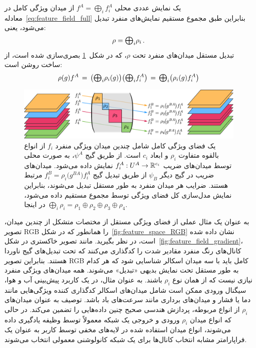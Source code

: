 				یک نمایش عددی محلی $f^A = \bigoplus_i f_i^A$ از میدان ویژگی کامل در معادله~\eqref{eq:feature_field_full} بنابراین طبق مجموع مستقیم نمایش‌های منفرد تبدیل می‌شود، یعنی:
				\begin{align}
					\rho = \scalebox{1.1}{$\bigoplus$}_i \rho_i \,.
				\end{align}
				تبدیل مستقل میدان‌های منفرد تحت $\rho$، که در شکل~\ref{fig:feature_spaces_oplus} بصری‌سازی شده است، از ساخت روشن است:
				\begin{align}
					\rho(g)f^A
					\,=\, \left(\scalebox{1.1}{$\bigoplus$}_i \rho_i(g)\right) \! \left(\scalebox{1.1}{$\bigoplus$}_i f_i^A\right)
					\,=\, \scalebox{1.1}{$\bigoplus$}_i \! \left(\rho_i(g) f_i^A\right)
				\end{align}
				
				\begin{figure}
					\centering
					\includegraphics[width=.94\textwidth]{figures/feature_field_repr_examples.pdf}
					\vspace*{0ex}
					\caption{\small
						یک فضای ویژگی کامل شامل چندین میدان ویژگی منفرد $f_i$ از انواع بالقوه متفاوت $\rho_i$ و ابعاد $c_i$ است.
						از طریق گیج $\psi^A$، به صورت محلی توسط میدان‌های ضریب $f_i^A: U^A \to \mathbb{R}^{c_i}$ نمایش داده می‌شود.
						میدان‌های ضریب در گیج دیگر $\psi_B$ از طریق تبدیل گیج $f_i^B = \rho_i\big(g^{BA}\big)f_i^A$ مرتبط هستند.
						ضرایب هر میدان منفرد به طور مستقل تبدیل می‌شوند، بنابراین نمایش مدل‌سازی کل فضای ویژگی توسط مجموع مستقیم داده می‌شود، در اینجا $\bigoplus_i \!\rho_i = \rho_1 \oplus \rho_2 \oplus \rho_3 \oplus \rho_4$.
					}
					\label{fig:feature_spaces_oplus}
					\end{figure}

						به عنوان یک مثال عملی از فضای ویژگی مستقل از مختصات متشکل از چندین میدان، تصویر RGB را همانطور که در شکل~\ref{fig:feature_space_RGB} نشان داده شده است، در نظر بگیرید.
						مانند تصویر خاکستری در شکل~\ref{fig:feature_field_gradient}، کانال‌های رنگ منفرد مقادیر شدت را کدگذاری می‌کنند که تحت تبدیل‌های گیج ناوردا هستند.
						بنابراین تصویر RGB کامل باید با سه میدان اسکالر شناسایی شود که هر کدام به طور مستقل تحت نمایش بدیهی «تبدیل» می‌شوند.
						همه میدان‌های ویژگی منفرد نیازی نیست که از همان نوع $\rho_i$ باشند.
						به عنوان مثال، در یک کاربرد پیش‌بینی آب و هوا، سیگنال ورودی ممکن است شامل میدان‌های اسکالر کدگذاری کننده ویژگی‌هایی مانند دما یا فشار و میدان‌های برداری مانند سرعت‌های باد باشد.
						توصیف به عنوان میدان‌های $\rho_i$ از انواع مربوطه، پردازش هندسی صحیح چنین داده‌هایی را تضمین می‌کند.
						در حالی که انواع میدان $\rho_i$ ورودی و خروجی یک شبکه معمولاً توسط وظیفه یادگیری داده می‌شوند، انواع میدان استفاده شده در لایه‌های مخفی توسط کاربر به عنوان یک فراپارامتر مشابه انتخاب کانال‌ها برای یک شبکه کانولوشنی معمولی انتخاب می‌شوند.